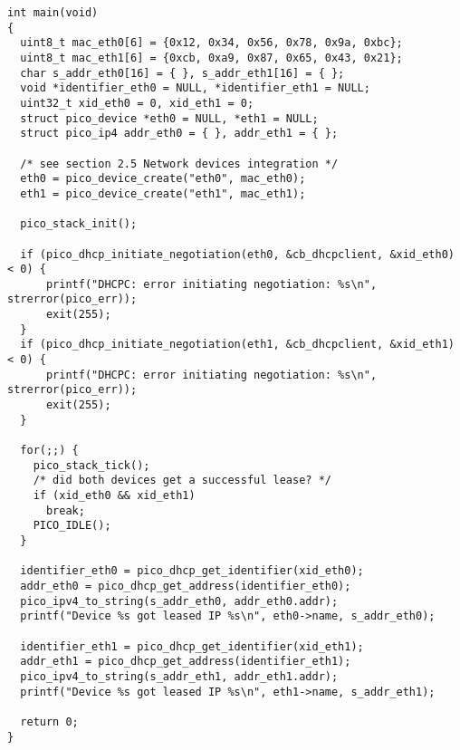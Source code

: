 \begin{verbatim}
int main(void)
{
  uint8_t mac_eth0[6] = {0x12, 0x34, 0x56, 0x78, 0x9a, 0xbc};
  uint8_t mac_eth1[6] = {0xcb, 0xa9, 0x87, 0x65, 0x43, 0x21};
  char s_addr_eth0[16] = { }, s_addr_eth1[16] = { };
  void *identifier_eth0 = NULL, *identifier_eth1 = NULL;
  uint32_t xid_eth0 = 0, xid_eth1 = 0;
  struct pico_device *eth0 = NULL, *eth1 = NULL;
  struct pico_ip4 addr_eth0 = { }, addr_eth1 = { };

  /* see section 2.5 Network devices integration */
  eth0 = pico_device_create("eth0", mac_eth0);
  eth1 = pico_device_create("eth1", mac_eth1);
  
  pico_stack_init();
  
  if (pico_dhcp_initiate_negotiation(eth0, &cb_dhcpclient, &xid_eth0) < 0) {
      printf("DHCPC: error initiating negotiation: %s\n", strerror(pico_err));
      exit(255);
  } 
  if (pico_dhcp_initiate_negotiation(eth1, &cb_dhcpclient, &xid_eth1) < 0) {
      printf("DHCPC: error initiating negotiation: %s\n", strerror(pico_err));
      exit(255);
  }
  
  for(;;) {
    pico_stack_tick();
    /* did both devices get a successful lease? */
    if (xid_eth0 && xid_eth1)
      break;
    PICO_IDLE();
  }
  
  identifier_eth0 = pico_dhcp_get_identifier(xid_eth0);
  addr_eth0 = pico_dhcp_get_address(identifier_eth0);
  pico_ipv4_to_string(s_addr_eth0, addr_eth0.addr);
  printf("Device %s got leased IP %s\n", eth0->name, s_addr_eth0);
  
  identifier_eth1 = pico_dhcp_get_identifier(xid_eth1);
  addr_eth1 = pico_dhcp_get_address(identifier_eth1);
  pico_ipv4_to_string(s_addr_eth1, addr_eth1.addr);
  printf("Device %s got leased IP %s\n", eth1->name, s_addr_eth1);
  
  return 0;
}
\end{verbatim}